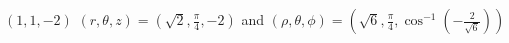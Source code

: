 {$(1, 1, -2)$
}
{$(r,\theta,z) = \left( \sqrt{2} , \frac{\pi}{4}, -2   \right)$ and $(\rho,\theta,\phi) = \left( \sqrt{6}, \frac{\pi}{4}, \cos^{-1}\left( -\frac{2}{\sqrt{6}}\right)  \right)$}